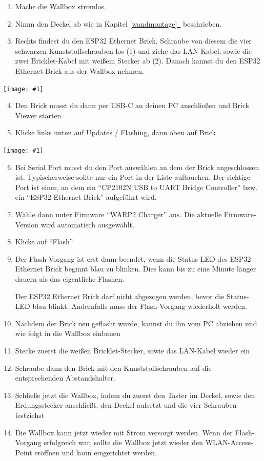\documentclass[a4paper,10pt]{article}
\newcommand{\hint}[1]{\begin{tcolorbox}[colback=boxgray,colframe=black,coltext=
white,title=Hinweis,left*=2mm,right*=2mm,boxsep=1mm,bottom=1mm,top=1mm]#1\end{tcolorbox}}
\newcommand{\gfx}[1]{\texttt{[image: \#1]}}
\newcommand*{\fullref}[1]{\hyperref[{#1}]{\ref*{#1}~\nameref*{#1}}}
\begin{document}
\begin{multicols*}{2}
	\begin{enumerate}
		\item Mache die Wallbox stromlos.
		\item Nimm den Deckel ab wie in Kapitel \fullref{wandmontage} beschrieben.
		\item Rechts findest du den ESP32 Ethernet Brick. Schraube von diesem die vier schwarzen Kunststoffschrauben los (1) und ziehe das LAN-Kabel, sowie die zwei Bricklet-Kabel mit weißem Stecker
		ab (2). Danach kannst du den ESP32 Ethernet Brick aus der Wallbox nehmen.
	\end{enumerate}
	\gfx{./img_warp2/resized/warp_factory_reset_cropped}
	\begin{enumerate}
		\setcounter{enumi}{3}
		\item Den Brick musst du dann per USB-C an deinen PC anschließen und Brick Viewer starten
		\item Klicke links unten auf Updates / Flashing, dann oben auf Brick
	\end{enumerate}
	\gfx{./img_warp2/resized/warp_factory_flash}
	\begin{enumerate}
		\setcounter{enumi}{5}
		\item Bei Serial Port musst du den Port auswählen an dem der Brick angeschlossen ist.
		      Typischerweise sollte nur ein Port in der Liste auftauchen.
		      Der richtige Port ist einer, an dem ein \enquote{CP2102N USB to UART Bridge Controller} bzw. ein \enquote{ESP32 Ethernet Brick} aufgeführt wird.
		\item Wähle dann unter Firmware \enquote{WARP2 Charger} aus. Die aktuelle Firmware-Version wird automatisch ausgewählt.
		\item Klicke auf \enquote{Flash}
		\item Der Flash-Vorgang ist erst dann beendet, wenn die Status-LED des ESP32 Ethernet Brick beginnt blau zu blinken. Dies kann bis zu eine Minute länger dauern als das eigentliche Flashen.
		\hint{Der ESP32 Ethernet Brick darf nicht abgezogen werden, bevor die Status-LED blau blinkt. Andernfalls muss der Flash-Vorgang wiederholt werden.}
		\item Nachdem der Brick neu geflasht wurde, kannst du ihn vom PC abziehen und wie folgt in die Wallbox einbauen
		\item Stecke zuerst die weißen Bricklet-Stecker, sowie das LAN-Kabel wieder ein
		\item Schraube dann den Brick mit den Kunststoffschrauben auf die entsprechenden Abstandshalter.
		\item Schließe jetzt die Wallbox, indem du zuerst den Taster im Deckel, sowie den Erdungsstecker anschließt, den Deckel aufsetzt und die vier Schrauben festziehst
		\item Die Wallbox kann jetzt wieder mit Strom versorgt werden. Wenn der Flash-Vorgang erfolgreich war, sollte die Wallbox jetzt wieder den WLAN-Access-Point eröffnen und kann eingerichtet werden.
	\end{enumerate}


\end{multicols*}
\end{document}
